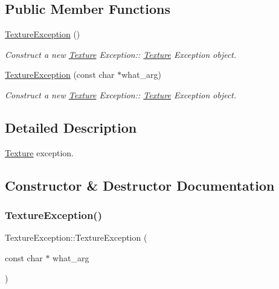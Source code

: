 \subsection*{Public Member Functions}
\begin{DoxyCompactItemize}
\item 
\mbox{\label{class_texture_exception_a770a11b973dac9f220bbae108997684e}} 
\hyperlink{class_texture_exception_a770a11b973dac9f220bbae108997684e}{Texture\+Exception} ()
\begin{DoxyCompactList}\small\item\em Construct a new \hyperlink{struct_texture}{Texture} Exception\+:\+: \hyperlink{struct_texture}{Texture} Exception object. \end{DoxyCompactList}\item 
\hyperlink{class_texture_exception_a1acd72ee069d2ff53a6ea4f11beed3c0}{Texture\+Exception} (const char $\ast$what\+\_\+arg)
\begin{DoxyCompactList}\small\item\em Construct a new \hyperlink{struct_texture}{Texture} Exception\+:\+: \hyperlink{struct_texture}{Texture} Exception object. \end{DoxyCompactList}\end{DoxyCompactItemize}


\subsection{Detailed Description}
\hyperlink{struct_texture}{Texture} exception. 

\subsection{Constructor \& Destructor Documentation}
\mbox{\label{class_texture_exception_a1acd72ee069d2ff53a6ea4f11beed3c0}} 
\subsubsection{\texorpdfstring{Texture\+Exception()}{TextureException()}}
{\footnotesize\ttfamily Texture\+Exception\+::\+Texture\+Exception (\begin{DoxyParamCaption}\item[{const char $\ast$}]{what\+\_\+arg }\end{DoxyParamCaption})\hspace{0.3cm}{\ttfamily [explicit]}}




